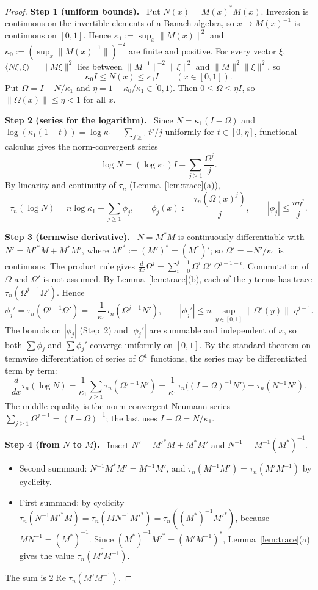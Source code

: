 \documentclass[11pt]{article}
\theoremstyle{remark}
\numberwithin{equation}{section}
\newcommand{\step}[1]{\par\smallskip\noindent\textbf{Step #1.}\ }
\begin{document}
\begin{proof}
\step{1 (uniform bounds)}
Put $N(x)=M(x)^*M(x)$. Inversion is continuous on the invertible elements of a Banach algebra, so $x\mapsto M(x)^{-1}$ is continuous on $[0,1]$. Hence $\kappa_1:=\sup_x\|M(x)\|^2$ and $\kappa_0:=(\sup_x\|M(x)^{-1}\|)^{-2}$ are finite and positive. For every vector $\xi$, $\langle N\xi,\xi\rangle=\|M\xi\|^2$ lies between $\|M^{-1}\|^{-2}\|\xi\|^2$ and $\|M\|^2\|\xi\|^2$, so
\[
 \kappa_0I\le N(x)\le\kappa_1I\qquad(x\in[0,1]).
\]
Put $\Omega=I-N/\kappa_1$ and $\eta=1-\kappa_0/\kappa_1\in[0,1)$. Then $0\le\Omega\le\eta I$, so $\|\Omega(x)\|\le\eta<1$ for all $x$.

\step{2 (series for the logarithm)}
Since $N=\kappa_1(I-\Omega)$ and $\log(\kappa_1(1-t))=\log\kappa_1-\sum_{j\ge1}t^j/j$ uniformly for $t\in[0,\eta]$, functional calculus gives the norm-convergent series
\[
 \log N=(\log\kappa_1)I-\sum_{j\ge1}\frac{\Omega^j}{j}.
\]
By linearity and continuity of $\tau_n$ (Lemma~\ref{lem:trace}(a)),
\[
 \tau_n(\log N)=n\log\kappa_1-\sum_{j\ge1}\phi_j,\qquad \phi_j(x):=\frac{\tau_n(\Omega(x)^j)}{j},\qquad|\phi_j|\le\frac{n\eta^j}{j}.
\]

\step{3 (termwise derivative)}
$N=M^*M$ is continuously differentiable with $N'=M'^*M+M^*M'$, where $M'^*:=(M')^*=(M^*)'$; so $\Omega'=-N'/\kappa_1$ is continuous. The product rule gives $\frac{d}{dx}\Omega^j=\sum_{i=0}^{j-1}\Omega^i\,\Omega'\,\Omega^{j-1-i}$. Commutation of $\Omega$ and $\Omega'$ is not assumed. By Lemma~\ref{lem:trace}(b), each of the $j$ terms has trace $\tau_n(\Omega^{j-1}\Omega')$. Hence
\[
 \phi_j'=\tau_n(\Omega^{j-1}\Omega')=-\frac1{\kappa_1}\tau_n(\Omega^{j-1}N'),\qquad
 |\phi_j'|\le n\,\sup_{y\in[0,1]}\|\Omega'(y)\|\;\eta^{j-1}.
\]
The bounds on $|\phi_j|$ (Step~2) and $|\phi_j'|$ are summable and independent of $x$, so both $\sum\phi_j$ and $\sum\phi_j'$ converge uniformly on $[0,1]$. By the standard theorem on termwise differentiation of series of $C^1$ functions, the series may be differentiated term by term:
\[
 \frac{d}{dx}\tau_n(\log N)
 =\frac1{\kappa_1}\sum_{j\ge1}\tau_n(\Omega^{j-1}N')
 =\frac1{\kappa_1}\tau_n\bigl((I-\Omega)^{-1}N'\bigr)
 =\tau_n(N^{-1}N').
\]
The middle equality is the norm-convergent Neumann series $\sum_{j\ge1}\Omega^{j-1}=(I-\Omega)^{-1}$; the last uses $I-\Omega=N/\kappa_1$.

\step{4 (from $N$ to $M$)}
Insert $N'=M'^*M+M^*M'$ and $N^{-1}=M^{-1}(M^*)^{-1}$.
\begin{itemize}[leftmargin=2em]
\item Second summand: $N^{-1}M^*M'=M^{-1}M'$, and $\tau_n(M^{-1}M')=\tau_n(M'M^{-1})$ by cyclicity.
\item First summand: by cyclicity $\tau_n(N^{-1}M'^*M)=\tau_n(MN^{-1}M'^*)=\tau_n((M^*)^{-1}M'^*)$, because $MN^{-1}=(M^*)^{-1}$. Since $(M^*)^{-1}M'^*=(M'M^{-1})^*$, Lemma~\ref{lem:trace}(a) gives the value $\overline{\tau_n(M'M^{-1})}$.
\end{itemize}
The sum is $2\operatorname{Re}\tau_n(M'M^{-1})$.
\end{proof}
\end{document}
